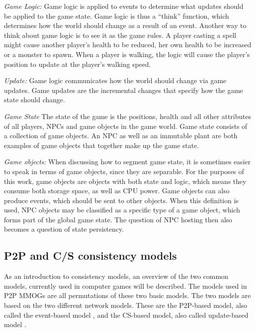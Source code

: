 \documentclass[10pt,a4paper,journal,cspaper,compsoc]{IEEEtran}
\begin{document}
\emph{Game Logic:} Game logic is applied to events to determine what updates should be applied to the game state. Game logic is thus a
    ``think'' function, which determines how the world should change as a result of an event. Another way to think about game logic is to see
    it as the game rules. A player casting a spell might cause another player's health to be reduced, her own health to be increased or a
    monster to spawn. When a player is walking, the logic will cause the player's position to update at the player's walking speed.

\emph{Update:} Game logic communicates how the world should change via game updates. Game updates are the incremental changes that specify how
    the game state should change.

\emph{Game State} The state of the game is the positions, health and all other attributes of all players, \acp{NPC} and game objects in the game
    world. Game state consists of a collection of game objects. An \ac{NPC} as well as an immutable plant are both examples of game objects that
    together make up the game state.

\emph{Game objects:} When discussing how to segment game state, it is sometimes easier to speak in terms of game objects, since they are
    separable. For the purposes of this work, game objects are objects with both state and logic, which means they consume both storage
    space, as well as CPU power. Game objects can also produce events, which should be sent to other objects. When this definition is used,
    NPC objects may be classified as a specific type of a game object, which forms part of the global game state. The question of NPC hosting
    then also becomes a question of state persistency.



\subsection{P2P and C/S consistency models}
\label{p2p_cs_models}

As an introduction to consistency models, an overview of the two common models, currently used in computer games will be described. The models used
in P2P MMOGs are all permutations of these two basic models. The two models are based on the two different network models. These are the P2P-based
model, also called the event-based model \cite{p2p_cm_aoe}, and the \ac{CS}-based model, also called update-based model \cite{unreal_networking}.
\end{document}
